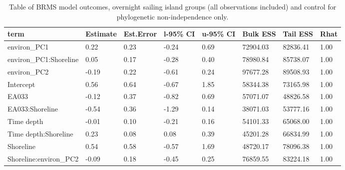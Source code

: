 \begin{table}[ht]
\centering
\begin{tabular}{p{3cm}p{1.35cm}p{1.35cm}p{1.35cm}p{1.35cm}p{1.35cm}p{1.35cm}p{1.35cm}}
  \toprule
term & Estimate & Est.Error & l-95\% CI & u-95\% CI & Bulk ESS & Tail ESS & Rhat \\ 
  \midrule
environ\_PC1 & 0.22 & 0.23 & -0.24 & 0.69 & 72904.03 & 82836.41 & 1.00 \\ 
  environ\_PC1:Shoreline & 0.05 & 0.17 & -0.28 & 0.40 & 78980.84 & 85738.07 & 1.00 \\ 
  environ\_PC2 & -0.19 & 0.22 & -0.61 & 0.24 & 97677.28 & 89508.93 & 1.00 \\ 
  Intercept & 0.56 & 0.64 & -0.67 & 1.85 & 58344.38 & 73165.98 & 1.00 \\ 
  EA033 & -0.12 & 0.37 & -0.82 & 0.69 & 57071.07 & 48826.58 & 1.00 \\ 
  EA033:Shoreline & -0.54 & 0.36 & -1.29 & 0.14 & 38071.03 & 53777.16 & 1.00 \\ 
  Time depth & -0.01 & 0.10 & -0.21 & 0.16 & 54101.33 & 65068.00 & 1.00 \\ 
  Time depth:Shoreline & 0.23 & 0.08 & 0.08 & 0.39 & 45201.28 & 66834.99 & 1.00 \\ 
  Shoreline & 0.54 & 0.58 & -0.57 & 1.69 & 48720.17 & 78096.38 & 1.00 \\ 
  Shoreline:environ\_PC2 & -0.09 & 0.18 & -0.45 & 0.25 & 76859.55 & 83224.18 & 1.00 \\ 
   \bottomrule
\end{tabular}
\caption{Table of BRMS model outcomes, overnight sailing island groups (all observations included) and control for phylogenetic non-independence only.} 
\label{BRMS_effects_SBZR_control_none}
\end{table}
